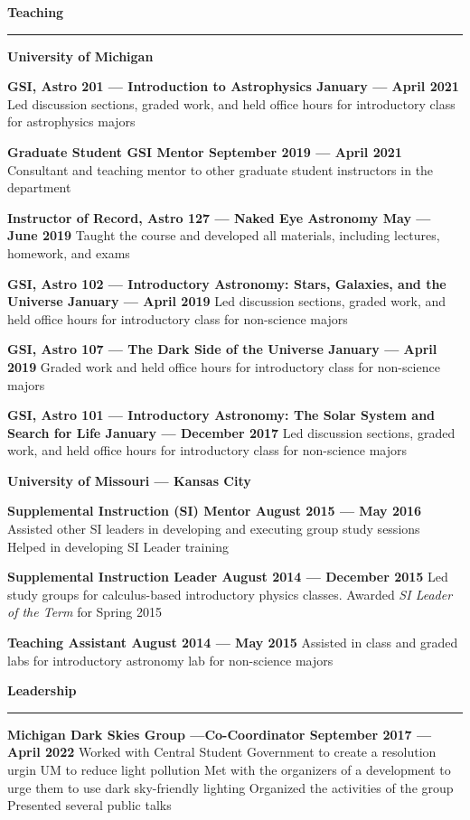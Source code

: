 \documentclass[10pt]{article}
\newcommand{\header}[1]{\vspace{2em}\par \textbf{\large #1}\strut\hrule\vspace{0em}}
\newcommand{\actionHeader}[2]{\textbf{#1 \hfill #2}}
\newcommand{\indentedItem}[1]{\newline\null\qquad #1}
\begin{document}
\header{Teaching} 
\actionHeader{University of Michigan}{}

\actionHeader{GSI, Astro 201 --- Introduction to Astrophysics}{January --- April 2021}
\indentedItem{Led discussion sections, graded work, and held office hours for introductory class for astrophysics majors}

\actionHeader{Graduate Student GSI Mentor}{September 2019 --- April 2021}
\indentedItem{Consultant and teaching mentor to other graduate student instructors in the department}

\actionHeader{Instructor of Record, Astro 127 --- Naked Eye Astronomy}{May --- June 2019}
\indentedItem{Taught the course and developed all materials, including lectures, homework, and exams}

\actionHeader{GSI, Astro 102 --- Introductory Astronomy: Stars, Galaxies, and the Universe}{January --- April 2019}
\indentedItem{Led discussion sections, graded work, and held office hours for introductory class for non-science majors}

\actionHeader{GSI, Astro 107 --- The Dark Side of the Universe}{January --- April 2019}
\indentedItem{Graded work and held office hours for introductory class for non-science majors}

\actionHeader{GSI, Astro 101 --- Introductory Astronomy: The Solar System and Search for Life}{January --- December 2017}
\indentedItem{Led discussion sections, graded work, and held office hours for introductory class for non-science majors}

\actionHeader{University of Missouri --- Kansas City}{}

\actionHeader{Supplemental Instruction (SI) Mentor}{August 2015 --- May 2016}
\indentedItem{Assisted other SI leaders in developing and executing group study sessions}
\indentedItem{Helped in developing SI Leader training}

\actionHeader{Supplemental Instruction Leader}{August 2014 --- December 2015}
\indentedItem{Led study groups for calculus-based introductory physics classes.}
\indentedItem{Awarded \textit{SI Leader of the Term} for Spring 2015}

\actionHeader{Teaching Assistant}{August 2014 --- May 2015}
\indentedItem{Assisted in class and graded labs for introductory astronomy lab for non-science majors}


\header{Leadership}
\actionHeader{Michigan Dark Skies Group ---Co-Coordinator}{September 2017 --- April 2022}
\indentedItem{Worked with Central Student Government to create a resolution urgin UM to reduce light pollution}
\indentedItem{Met with the organizers of a development to urge them to use dark sky-friendly lighting}
\indentedItem{Organized the activities of the group}
\indentedItem{Presented several public talks}
\end{document}
